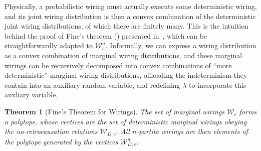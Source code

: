 \documentclass[10pt, a4paper]{article}
\numberwithin{equation}{section} %
\newcounter{stmt} %
\theoremstyle{definition}
\theoremstyle{plain}
\newtheorem{theorem}[stmt]{Theorem}
\newcommand{\?}{\mathrel{?}} %
\newcommand{\sW}{\mathcal{W}}
\begin{document}
              Physically, a probabilistic wiring must actually execute some deterministic wiring, and its joint wiring distribution is then a convex combination of the deterministic joint wiring distributions, of which there are finitely many. This is the intuition behind the proof of Fine's theorem () presented in~\cite{BellNonlocality}, which can be straightforwardly adapted to \(\sW_c^n\). Informally, we can express a wiring distribution as a convex combination of marginal wiring distributions, and these marginal wirings can be recursively decomposed into convex combinations of ``more deterministic'' marginal wiring distributions, offloading the indeterminism they contain into an auxiliary random variable, and redefining \(\lambda\) to incorporate this auxliary variable.
              \begin{theorem}[Fine's Theorem for Wirings]
                The set of marginal wirings \(\sW_c\) forms a polytope, whose vertices are the set of deterministic marginal wirings obeying the no-retrocausation relations \(\sW_{D,c}\). All \(n\)-partite wirings are then elements of the polytope generated by the vertices \(\sW_{D,c}^n\).
              \end{theorem}
\end{document}
